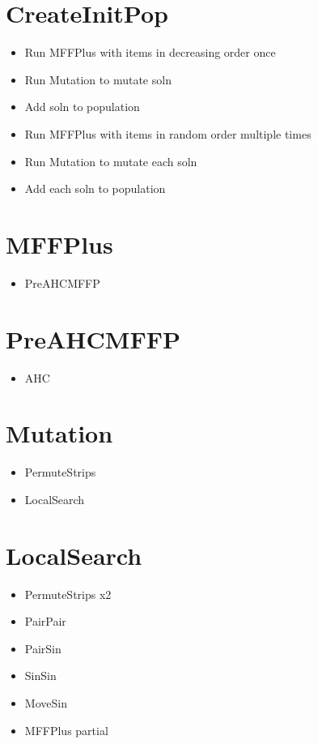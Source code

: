 \documentclass{elsarticle}
\begin{document}
\section{CreateInitPop}
\begin{itemize}
	\item Run MFFPlus with items in decreasing order once
	\item Run Mutation to mutate soln
	\item Add soln to population
	\item Run MFFPlus with items in random order multiple times
	\item Run Mutation to mutate each soln
	\item Add each soln to population
\end{itemize}

\section{MFFPlus}
\begin{itemize}
	\item PreAHCMFFP
\end{itemize}

\section{PreAHCMFFP}
\begin{itemize}
	\item AHC
\end{itemize}

\section{Mutation}
\begin{itemize}
	\item PermuteStrips
	\item LocalSearch
\end{itemize}

\section{LocalSearch}
\begin{itemize}
	\item PermuteStrips x2
	\item PairPair
	\item PairSin
	\item SinSin
	\item MoveSin
	\item MFFPlus partial
\end{itemize}
\end{document}
